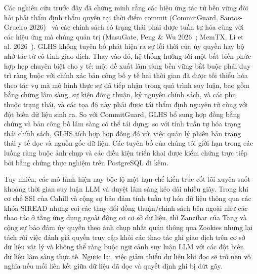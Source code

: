 \documentclass[11pt]{article}
\begin{document}
Các nghiên cứu trước đây đã chứng minh rằng các hiệu ứng tác tử bền vững đòi hỏi phải thẩm định thẩm quyền tại thời điểm commit (CommitGuard, Santos-Grueiro 2026)~\cite{temporaryauth} và các chính sách có trạng thái phải được tuần tự hóa cùng với các hiệu ứng mà chúng quản trị (MasuGate, Peng \& Wu 2026~\cite{statefulgov}; MemTX, Li et al. 2026~\cite{memtx}). GLHS không tuyên bố phát hiện ra sự lỗi thời của ủy quyền hay bộ nhớ tác tử có tính giao dịch. Thay vào đó, hệ thống hướng tới một bất biến phức hợp hẹp chuyên biệt cho y tế: một đề xuất lâm sàng bền vững bắt buộc phải duy trì ràng buộc với chính xác bản công bố y tế hai thời gian đã được tối thiểu hóa theo tác vụ mà mô hình thực sự đã tiếp nhận trong quá trình suy luận, bao gồm bằng chứng lâm sàng, sự kiện đồng thuận, kỷ nguyên chính sách, và các phụ thuộc trạng thái, và các tọa độ này phải được tái thẩm định nguyên tử cùng với đột biến dữ liệu sinh ra. So với CommitGuard, GLHS bổ sung hợp đồng bằng chứng và bản công bố lâm sàng có thể tái dựng; so với tính tuần tự hóa trạng thái chính sách, GLHS tích hợp hợp đồng đó với việc quản lý phiên bản trạng thái y tế dọc và nguồn gốc dữ liệu. Các tuyên bố của chúng tôi giới hạn trong các luồng ràng buộc ảnh chụp và các điều kiện triển khai được kiểm chứng trực tiếp bởi bằng chứng thực nghiệm trên PostgreSQL đi kèm.

Tuy nhiên, các mô hình hiện nay bộc lộ một hạn chế kiến trúc cốt lõi xuyên suốt khoảng thời gian suy luận LLM và duyệt lâm sàng kéo dài nhiều giây. Trong khi cơ chế SSI của Cahill và cộng sự bảo đảm tính tuần tự hóa dữ liệu thông qua các khóa SIREAD nhưng coi các thay đổi đồng thuận/chính sách bên ngoài như các thao tác ở tầng ứng dụng ngoài động cơ cơ sở dữ liệu, thì Zanzibar của Tang và cộng sự bảo đảm ủy quyền theo ảnh chụp nhất quán thông qua Zookies nhưng lại tách rời việc đánh giá quyền truy cập khỏi các thao tác ghi giao dịch trên cơ sở dữ liệu vật lý và không thể ràng buộc ngữ cảnh suy luận LLM với các đột biến dữ liệu lâm sàng thực tế. Ngược lại, việc giảm thiểu dữ liệu khi đọc sẽ trở nên vô nghĩa nếu mối liên kết giữa dữ liệu đã đọc và quyết định ghi bị đứt gãy.
\end{document}
